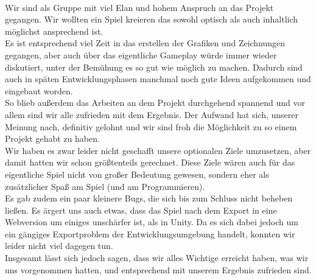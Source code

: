 \documentclass[10pt,a4paper,notitlepage]{report}
\begin{document}
	\\\par\medskip\Text
	Wir sind als Gruppe mit viel Elan und hohem Anspruch an das Projekt gegangen. Wir wollten ein Spiel kreieren das sowohl optisch als auch inhaltlich möglichst ansprechend ist.\\
	Es ist entsprechend viel Zeit in das erstellen der Grafiken und Zeichnungen gegangen, aber auch über das eigentliche Gameplay würde immer wieder diskutiert, unter der Bemühung es so gut wie möglich zu machen. Dadurch sind auch in späten Entwicklungsphasen manchmal noch gute Ideen aufgekommen und eingebaut worden.\\
	So blieb außerdem das Arbeiten an dem Projekt durchgehend spannend und vor allem sind wir alle zufrieden mit dem Ergebnis. Der Aufwand hat sich, unserer Meinung nach, definitiv gelohnt und wir sind froh die Möglichkeit zu so einem Projekt gehabt zu haben.\\
	Wir haben es zwar leider nicht geschafft unsere optionalen Ziele umzusetzen, aber damit hatten wir schon größtenteils gerechnet. Diese Ziele wären auch für das eigentliche Spiel nicht von großer Bedeutung gewesen, sondern eher als zusätzlicher Spaß am Spiel (und am Programmieren).\\
	Es gab zudem ein paar kleinere Bugs, die sich bis zum Schluss nicht beheben ließen. Es ärgert uns auch etwas, dass das Spiel nach dem Export in eine Webversion um einiges unschärfer ist, als in Unity. Da es sich dabei jedoch um ein gängiges Exportproblem der Entwicklungsumgebung handelt, konnten wir leider nicht viel dagegen tun.\\
	Insgesamt lässt sich jedoch sagen, dass wir alles Wichtige erreicht haben, was wir uns vorgenommen hatten, und entsprechend mit unserem Ergebnis zufrieden sind.\\\par\smallskip
	
	\\\par\medskip\Text
	
\end{document}

